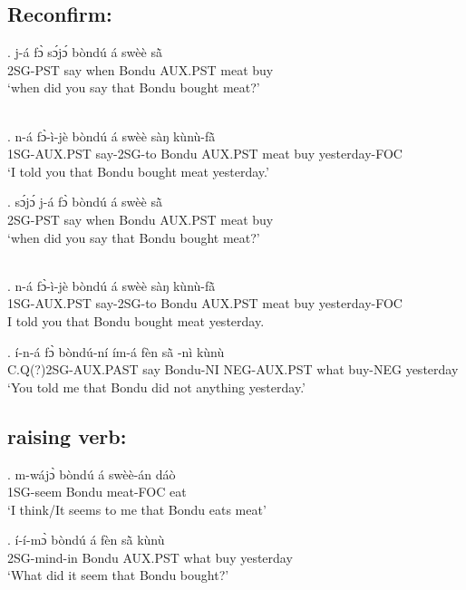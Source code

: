 \documentclass{assets/fieldnotes}
\begin{document}

\subsection{Reconfirm:}

\exg. j-á fɔ̀ sɔ́jɔ́ bòndú á swèè sã̀ \\
2SG-PST say when Bondu AUX.PST meat buy\\
`when did you say that Bondu bought meat?' 

\\

\exg. n-á fɔ̀-ì-jè bòndú á swèè sàŋ kùnù-fã̀\\
1SG-AUX.PST say-2SG-to Bondu AUX.PST meat buy yesterday-FOC\\
`I told you that Bondu bought meat yesterday.'

\exg. sɔ́jɔ́ j-á fɔ̀ bòndú á swèè sã̀ \\
2SG-PST say when Bondu AUX.PST meat buy\\
`when did you say that Bondu bought meat?' 

\\

\exg. n-á fɔ̀-ì-jè bòndú á swèè sàŋ kùnù-fã̀\\
1SG-AUX.PST say-2SG-to Bondu AUX.PST meat buy yesterday-FOC\\
I told you that Bondu bought meat yesterday. 


\exg. í-n-á fɔ̀ bòndú-ní ím-á fèn sã̀ -nì kùnù\\
C.Q(?)2SG-AUX.PAST say Bondu-NI NEG-AUX.PST what buy-NEG yesterday\\
`You told me that Bondu did not anything yesterday.' 


\subsection{raising verb:}

\exg. m-wájɔ̀ bòndú á swèè-án dáò\\
1SG-seem Bondu meat-FOC eat \\
`I think/It seems to me that Bondu eats meat' 

\exg. í-í-mɔ̀ bòndú á fèn sã̀  kùnù \\
2SG-mind-in Bondu AUX.PST what buy yesterday\\
`What did it seem that Bondu bought?' 
\end{document}
